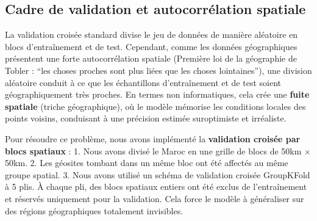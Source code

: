 \documentclass[11pt,twocolumn,a4paper]{article}
\begin{document}
\subsection{Cadre de validation et autocorrélation spatiale}
La validation croisée standard divise le jeu de données de manière aléatoire en blocs d'entraînement et de test. Cependant, comme les données géographiques présentent une forte autocorrélation spatiale (Première loi de la géographie de Tobler : ``les choses proches sont plus liées que les choses lointaines''), une division aléatoire conduit à ce que les échantillons d'entraînement et de test soient géographiquement très proches. En termes non informatiques, cela crée une \textbf{fuite spatiale} (triche géographique), où le modèle mémorise les conditions locales des points voisins, conduisant à une précision estimée suroptimiste et irréaliste.

Pour résoudre ce problème, nous avons implémenté la \textbf{validation croisée par blocs spatiaux} :
1. Nous avons divisé le Maroc en une grille de blocs de 50km $\times$ 50km.
2. Les géosites tombant dans un même bloc ont été affectés au même groupe spatial.
3. Nous avons utilisé un schéma de validation croisée GroupKFold à 5 plis. À chaque pli, des blocs spatiaux entiers ont été exclus de l'entraînement et réservés uniquement pour la validation. Cela force le modèle à généraliser sur des régions géographiques totalement invisibles.
\end{document}
